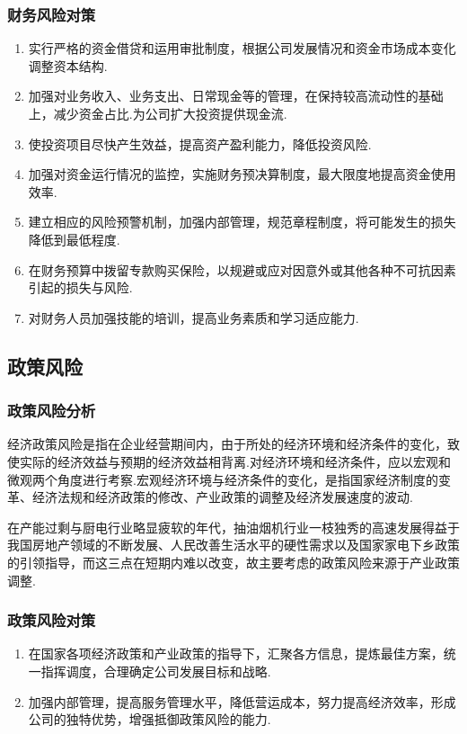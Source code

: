 \subsubsection{财务风险对策}
\begin{enumerate}
\item 实行严格的资金借贷和运用审批制度，根据公司发展情况和资金市场成本变化调整资本结构.
\item 加强对业务收入、业务支出、日常现金等的管理，在保持较高流动性的基础上，减少资金占比.为公司扩大投资提供现金流.
\item 使投资项目尽快产生效益，提高资产盈利能力，降低投资风险.
\item 加强对资金运行情况的监控，实施财务预决算制度，最大限度地提高资金使用效率.
\item 建立相应的风险预警机制，加强内部管理，规范章程制度，将可能发生的损失降低到最低程度.
\item 在财务预算中拨留专款购买保险，以规避或应对因意外或其他各种不可抗因素引起的损失与风险.
\item 对财务人员加强技能的培训，提高业务素质和学习适应能力.
\end{enumerate}


\subsection{政策风险}
\subsubsection{政策风险分析}
经济政策风险是指在企业经营期间内，由于所处的经济环境和经济条件的变化，致使实际的经济效益与预期的经济效益相背离.对经济环境和经济条件，应以宏观和微观两个角度进行考察.宏观经济环境与经济条件的变化，是指国家经济制度的变革、经济法规和经济政策的修改、产业政策的调整及经济发展速度的波动.

在产能过剩与厨电行业略显疲软的年代，抽油烟机行业一枝独秀的高速发展得益于我国房地产领域的不断发展、人民改善生活水平的硬性需求以及国家家电下乡政策的引领指导，而这三点在短期内难以改变，故主要考虑的政策风险来源于产业政策调整.

\subsubsection{政策风险对策}
\begin{enumerate}
\item 在国家各项经济政策和产业政策的指导下，汇聚各方信息，提炼最佳方案，统一指挥调度，合理确定公司发展目标和战略.
\item 加强内部管理，提高服务管理水平，降低营运成本，努力提高经济效率，形成公司的独特优势，增强抵御政策风险的能力.
\end{enumerate}


